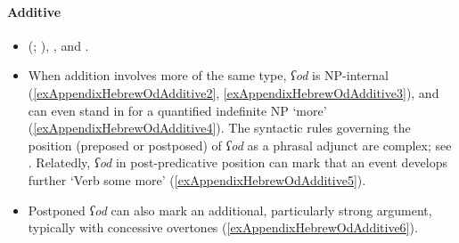 \paragraph{Additive}
\label{appendixHebrewOdAdditive}
\begin{itemize}
	\sloppy
	\item \citeauthor{Glinert1976} (\citeyear{Glinert1976}; \citeyear[78, 87, 226]{Glinert1989}), \textcite{Greenberg2012}, \textcite{Thomas2018} and \textcite{Tobin1985}.
	\item When addition involves more of the same type, \textit{ʕod} is NP-internal (\ref{exAppendixHebrewOdAdditive2}, \ref{exAppendixHebrewOdAdditive3}), and can even stand in for a quantified indefinite NP \lq more\rq{ }(\ref{exAppendixHebrewOdAdditive4}). The syntactic rules governing the position (preposed or postposed) of \textit{ʕod} as a phrasal adjunct are complex; see \textcite{Glinert1976}. Relatedly, \textit{ʕod} in post-predicative position can mark that an event develops further \lq Verb some more' (\ref{exAppendixHebrewOdAdditive5}).
	\item Postponed \textit{ʕod} can also mark an additional, particularly strong argument, typically with concessive overtones (\ref{exAppendixHebrewOdAdditive6}).
\end{itemize}

